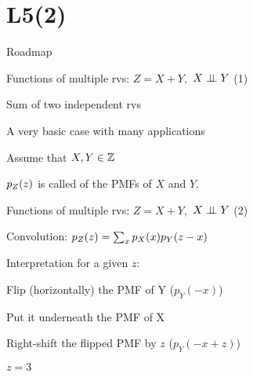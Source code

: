 \section{L5(2)}
\begin{frame}{Roadmap}


\plitemsep 0.1in

\bce[(1)]

\item {}

\item {}

\item {}


\ece

\end{frame}


\begin{frame}{Functions of multiple rvs: $Z=X+Y,$ $X\perp \!\!\! \perp Y$ (1)}

\plitemsep 0.1in
\bci
\item Sum of two independent rvs
\item<2-> A very basic case with many applications
\item<2-> Assume that $X,Y \in {\mathbb Z}$
\vspace{-0.3cm}
\item<4-> $p_Z(z)$ is called  of the PMFs of $X$ and $Y.$
\eci

\end{frame}


\begin{frame}{Functions of multiple rvs: $Z=X+Y,$ $X\perp \!\!\! \perp Y$ (2)}

{
\small
\plitemsep 0.15in
\bci
\item Convolution: $p_Z(z) = \sum_{x} p_X(x) p_Y(z-x)$
\item Interpretation for a given $z$:
\bce[(i)]
\item Flip (horizontally) the PMF of Y ($p_{Y}(-x)$)
\item Put it underneath the PMF of X
\item Right-shift the flipped PMF by $z$ ($p_{Y}(-x+z)$)
\ece
\eci
}
{
\exam $z=3$
}

\end{frame}


